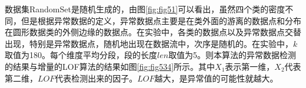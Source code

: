 数据集RandomSet是随机生成的，由图\ref{fig:fig51}可以看出，虽然四个类的密度不同，但是根据异常数据的定义，异常数据点主要是在类外面的游离的数据点和分布在圆形数据类的外侧边缘的数据点。在实验中，各类的数据点以及异常数据点交替出现，特别是异常数据点，随机地出现在数据流中，次序是随机的。在实验中，$k$取值为180。每个维度平均分段，段的长度$len$取值为5。则本算法的异常数据检测的结果与增量的LOF算法的结果如图\ref{fig:fig534}所示。其中$X_1$表示第一维，$X_2$代表第二维，$LOF$代表检测出来的因子。$LOF$越大，是异常值的可能性就越大。

\begin{figure}[htbp]
	\centering                                      %
\end{figure}
